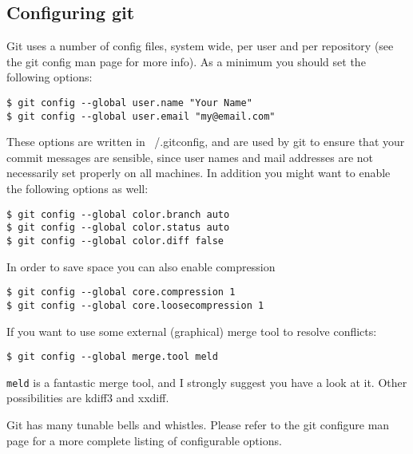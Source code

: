 \documentclass[a4paper,10pt]{article}
\begin{document}
\subsection{Configuring git}
Git uses a number of config files, system
wide, per user and per repository (see the git config man page for more info).
As a minimum you should set the following options:
\begin{verbatim}
$ git config --global user.name "Your Name"
$ git config --global user.email "my@email.com"
\end{verbatim}
These options are written in ~/.gitconfig, and are used by git to ensure that
your commit messages are sensible, since user names and mail addresses are not
necessarily set properly on all machines. In addition you might want to enable
the following options as well:
\begin{verbatim}
$ git config --global color.branch auto
$ git config --global color.status auto
$ git config --global color.diff false
\end{verbatim}
In order to save space you can also enable compression
\begin{verbatim}
$ git config --global core.compression 1
$ git config --global core.loosecompression 1
\end{verbatim}
If you want to use some external (graphical) merge tool to resolve conflicts:
\begin{verbatim}
$ git config --global merge.tool meld
\end{verbatim}
\texttt{meld} is a fantastic merge tool, and I strongly suggest you have a
look at it.  Other possibilities are kdiff3 and xxdiff.

Git has many tunable bells and whistles. Please refer to the git configure
man page for a more complete listing of configurable options.
\end{document}
